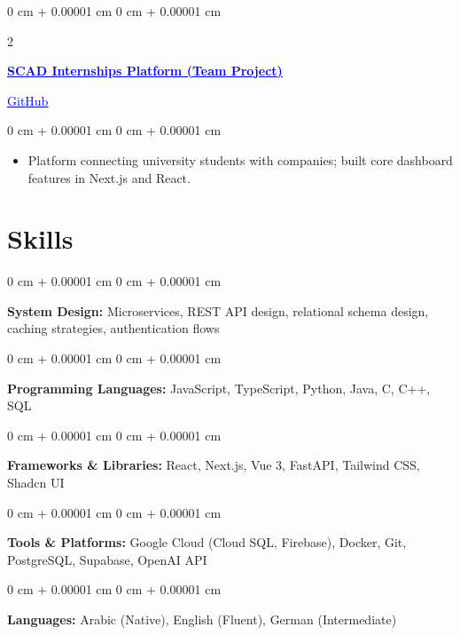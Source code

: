 \documentclass[10pt, letterpaper]{article}
\newenvironment{highlights}{
    \begin{itemize}[
        topsep=0.05 cm,
        parsep=0.05 cm,
        partopsep=0pt,
        itemsep=0pt,
        leftmargin=0 cm + 10pt
    ]
}{
    \end{itemize}
}
\newenvironment{onecolentry}{
    \begin{adjustwidth}{
        0 cm + 0.00001 cm
    }{
        0 cm + 0.00001 cm
    }
}{
    \end{adjustwidth}
}
\newenvironment{twocolentry}[2][]{
    \onecolentry
    \def\secondColumn{#2}
    \setcolumnwidth{\fill, 4.5 cm}
    \begin{paracol}{2}
}{
    \switchcolumn \raggedleft \secondColumn
    \end{paracol}
    \endonecolentry
}
\begin{document}
    \vspace{0.08 cm}

    \begin{twocolentry}{
        2025 \hspace{0.5cm} \href{https://github.com/kha1dx/scad/tree/main}{\textcolor{blue}{\underline{GitHub}}}
    }
        \textbf{\href{https://scad-eight.vercel.app/}{\textcolor{blue}{\underline{SCAD Internships Platform (Team Project)}}}}
    \end{twocolentry}

    \vspace{0.06 cm}
    \begin{onecolentry}
        \begin{highlights}
            \item Platform connecting university students with companies; built core dashboard features in Next.js and React.
        \end{highlights}
    \end{onecolentry}

    \section{Skills}

    \begin{onecolentry}
        \textbf{System Design:} Microservices, REST API design, relational schema design, caching strategies, authentication flows
    \end{onecolentry}
    \vspace{0.06 cm}
    \begin{onecolentry}
        \textbf{Programming Languages:} JavaScript, TypeScript, Python, Java, C, C++, SQL
    \end{onecolentry}
    \vspace{0.06 cm}
    \begin{onecolentry}
        \textbf{Frameworks \& Libraries:} React, Next.js, Vue 3, FastAPI, Tailwind CSS, Shadcn UI
    \end{onecolentry}
    \vspace{0.06 cm}
    \begin{onecolentry}
        \textbf{Tools \& Platforms:} Google Cloud (Cloud SQL, Firebase), Docker, Git, PostgreSQL, Supabase, OpenAI API
    \end{onecolentry}
    \vspace{0.06 cm}
    \begin{onecolentry}
        \textbf{Languages:} Arabic (Native), English (Fluent), German (Intermediate)
    \end{onecolentry}
\end{document}
